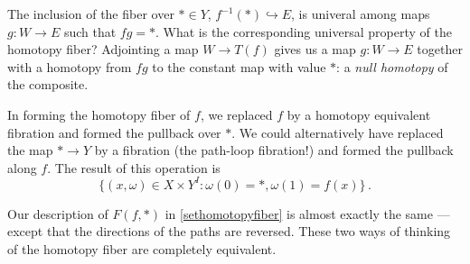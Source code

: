 The inclusion of the fiber over $*\in Y$, $f^{-1}(*)\hookrightarrow E$,
is univeral among maps $g:W\to E$ such that $fg=*$. What is the corresponding
universal property of the homotopy fiber? Adjointing a map $W\to T(f)$ 
gives us a map $g:W\to E$ together with a homotopy from $fg$ to the constant 
map with value $*$: a {\em null homotopy} of the composite. 

\begin{remark} In forming the homotopy fiber of $f$, we replaced $f$ by
a homotopy equivalent fibration and formed the pullback over $*$. 
We could alternatively have replaced the map $*\to Y$ by a fibration
(the path-loop fibration!) and formed the pullback along $f$. The result of
this operation is
\[
\{(x,\omega)\in X\times Y^I:\omega(0) = \ast, \omega(1) = f(x)\}\,.
\]

Our description of $F(f,\ast)$ in \eqref{sethomotopyfiber} is almost exactly the same --- except that
the directions of the paths are reversed. These two ways of thinking of the
homotopy fiber are completely equivalent.
\end{remark}
